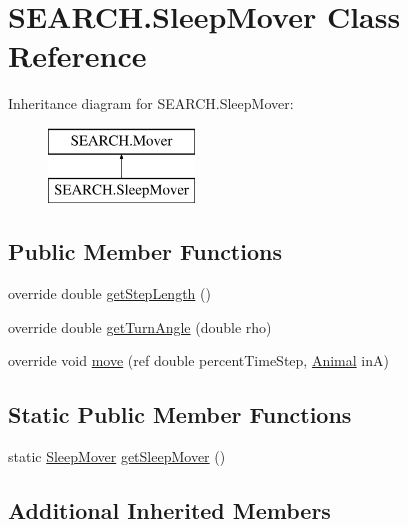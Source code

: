 \hypertarget{class_s_e_a_r_c_h_1_1_sleep_mover}{\section{S\-E\-A\-R\-C\-H.\-Sleep\-Mover Class Reference}
\label{class_s_e_a_r_c_h_1_1_sleep_mover}
}


 


Inheritance diagram for S\-E\-A\-R\-C\-H.\-Sleep\-Mover\-:\begin{figure}[H]
\begin{center}
\leavevmode
\includegraphics[height=2.000000cm]{class_s_e_a_r_c_h_1_1_sleep_mover}
\end{center}
\end{figure}
\subsection*{Public Member Functions}
\begin{DoxyCompactItemize}
\item 
override double \hyperlink{class_s_e_a_r_c_h_1_1_sleep_mover_a00e109927daf570d0c406339478131f9}{get\-Step\-Length} ()
\item 
override double \hyperlink{class_s_e_a_r_c_h_1_1_sleep_mover_a47d7e8dbf23341dd28383c9996d1b8c6}{get\-Turn\-Angle} (double rho)
\item 
override void \hyperlink{class_s_e_a_r_c_h_1_1_sleep_mover_a0bd6a7a748ebf84be7d7f209b395a8ce}{move} (ref double percent\-Time\-Step, \hyperlink{class_s_e_a_r_c_h_1_1_animal}{Animal} in\-A)
\end{DoxyCompactItemize}
\subsection*{Static Public Member Functions}
\begin{DoxyCompactItemize}
\item 
static \hyperlink{class_s_e_a_r_c_h_1_1_sleep_mover}{Sleep\-Mover} \hyperlink{class_s_e_a_r_c_h_1_1_sleep_mover_a2d2886842316b87f35e94c1a1e1a45bd}{get\-Sleep\-Mover} ()
\end{DoxyCompactItemize}
\subsection*{Additional Inherited Members}


